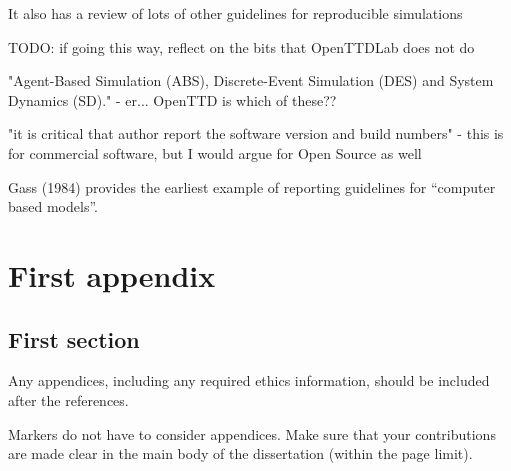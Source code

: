 \documentclass[logo,msc]{infthesis}           %
\begin{document}
\begin{itemize}
\begin{itemize}
\begin{item}
It also has a review of lots of other guidelines for reproducible simulations

TODO: if going this way, reflect on the bits that OpenTTDLab does not do

"Agent-Based Simulation (ABS), Discrete-Event Simulation (DES) and System Dynamics (SD)." - er... OpenTTD is which of these??

"it is critical that author report the software version and build numbers" - this is for commercial software, but I would argue for Open Source as well
\end{item}

\begin{item}
Gass (1984) provides the earliest example of reporting guidelines for “computer based models”.
\end{item}
\end{itemize}

\end{itemize}






\appendix

\chapter{First appendix}

\section{First section}

Any appendices, including any required ethics information, should be included
after the references.

Markers do not have to consider appendices. Make sure that your contributions
are made clear in the main body of the dissertation (within the page limit).
\end{document}
